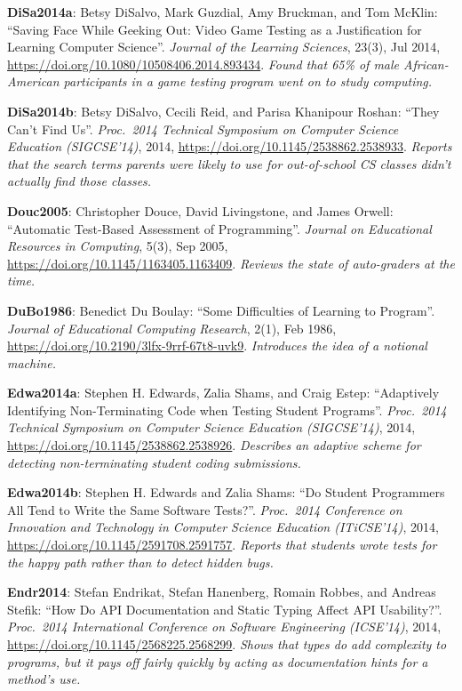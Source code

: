 \textbf{\hypertarget{b:DiSa2014a}{DiSa2014a}\label{b:DiSa2014a}}: Betsy DiSalvo, Mark Guzdial, Amy Bruckman, and Tom McKlin: ``Saving Face While Geeking Out: Video Game Testing as a Justification for Learning Computer Science''. \emph{Journal of the Learning Sciences}, 23(3), Jul 2014, \url{https://doi.org/10.1080/10508406.2014.893434}. \emph{Found that 65\% of male African-American participants in a game testing program went on to study computing.}

\textbf{\hypertarget{b:DiSa2014b}{DiSa2014b}\label{b:DiSa2014b}}: Betsy DiSalvo, Cecili Reid, and Parisa Khanipour Roshan: ``They Can't Find Us''. \emph{Proc.\ 2014 Technical Symposium on Computer Science Education (SIGCSE'14)}, 2014, \url{https://doi.org/10.1145/2538862.2538933}. \emph{Reports that the search terms parents were likely to use for out-of-school CS classes didn't actually find those classes.}

\textbf{\hypertarget{b:Douc2005}{Douc2005}\label{b:Douc2005}}: Christopher Douce, David Livingstone, and James Orwell: ``Automatic Test-Based Assessment of Programming''. \emph{Journal on Educational Resources in Computing}, 5(3), Sep 2005, \url{https://doi.org/10.1145/1163405.1163409}. \emph{Reviews the state of auto-graders at the time.}

\textbf{\hypertarget{b:DuBo1986}{DuBo1986}\label{b:DuBo1986}}: Benedict Du Boulay: ``Some Difficulties of Learning to Program''. \emph{Journal of Educational Computing Research}, 2(1), Feb 1986, \url{https://doi.org/10.2190/3lfx-9rrf-67t8-uvk9}. \emph{Introduces the idea of a notional machine.}

\textbf{\hypertarget{b:Edwa2014a}{Edwa2014a}\label{b:Edwa2014a}}: Stephen H. Edwards, Zalia Shams, and Craig Estep: ``Adaptively Identifying Non-Terminating Code when Testing Student Programs''. \emph{Proc.\ 2014 Technical Symposium on Computer Science Education (SIGCSE'14)}, 2014, \url{https://doi.org/10.1145/2538862.2538926}. \emph{Describes an adaptive scheme for detecting non-terminating student coding submissions.}

\textbf{\hypertarget{b:Edwa2014b}{Edwa2014b}\label{b:Edwa2014b}}: Stephen H. Edwards and Zalia Shams: ``Do Student Programmers All Tend to Write the Same Software Tests?''. \emph{Proc.\ 2014 Conference on Innovation and Technology in Computer Science Education (ITiCSE'14)}, 2014, \url{https://doi.org/10.1145/2591708.2591757}. \emph{Reports that students wrote tests for the happy path rather than to detect hidden bugs.}

\textbf{\hypertarget{b:Endr2014}{Endr2014}\label{b:Endr2014}}: Stefan Endrikat, Stefan Hanenberg, Romain Robbes, and Andreas Stefik: ``How Do API Documentation and Static Typing Affect API Usability?''. \emph{Proc.\ 2014 International Conference on Software Engineering (ICSE'14)}, 2014, \url{https://doi.org/10.1145/2568225.2568299}. \emph{Shows that types do add complexity to programs, but it pays off fairly quickly by acting as documentation hints for a method's use.}


